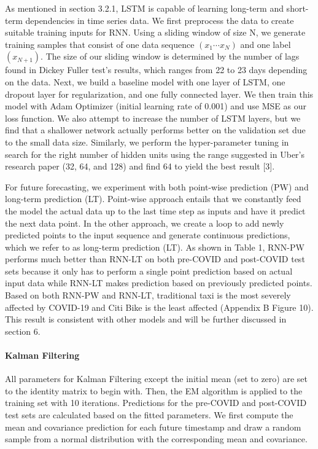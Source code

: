 \documentclass{article}
\begin{document}
As mentioned in section 3.2.1, LSTM is capable of learning long-term and short-term dependencies in time series data. We first preprocess the data to create suitable training inputs for RNN. Using a sliding window of size N, we generate training samples that consist of one data sequence $(x_1 \cdots x_N)$ and one label $(x_{N+1})$. The size of our sliding window is determined by the number of lags found in Dickey Fuller test’s results, which ranges from 22 to 23 days depending on the data. Next, we build a baseline model with one layer of LSTM, one dropout layer for regularization, and one fully connected layer. We then train this model with Adam Optimizer (initial learning rate of 0.001) and use MSE as our loss function. We also attempt to increase the number of LSTM layers, but we find that a shallower network actually performs better on the validation set due to the small data size. Similarly, we perform the hyper-parameter tuning in search for the right number of hidden units using the range suggested in Uber’s research paper (32, 64, and 128) and find 64 to yield the best result [3]. 

For future forecasting, we experiment with both point-wise prediction (PW) and long-term prediction (LT). Point-wise approach entails that we constantly feed the model the actual data up to the last time step as inputs and have it predict the next data point. In the other approach, we create a loop to add newly predicted points to the input sequence and generate continuous predictions, which we refer to as long-term prediction (LT). As shown in Table 1, RNN-PW performs much better than RNN-LT on both pre-COVID and post-COVID test sets because it only has to perform a single point prediction based on actual input data while RNN-LT makes prediction based on previously predicted points. Based on both RNN-PW and RNN-LT, traditional taxi is the most severely affected by COVID-19 and Citi Bike is the least affected (Appendix B Figure 10). This result is consistent with other models and will be further discussed in section 6.

\paragraph{Kalman Filtering}

All parameters for Kalman Filtering except the initial mean (set to zero) are set to the identity matrix to begin with. Then, the EM algorithm is applied to the training set with 10 iterations. Predictions for the pre-COVID and post-COVID test sets are calculated based on the fitted parameters. We first compute the mean and covariance prediction for each future timestamp and draw a random sample from a normal distribution with the corresponding mean and covariance.
\end{document}
